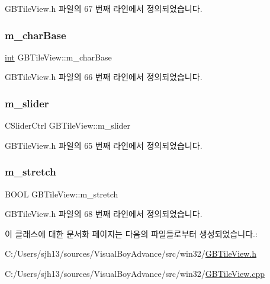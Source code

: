 G\+B\+Tile\+View.\+h 파일의 67 번째 라인에서 정의되었습니다.

\mbox{\label{class_g_b_tile_view_a0ad19c822952ef98ced0a46d051cb87e}} 
\subsubsection{\texorpdfstring{m\+\_\+char\+Base}{m\_charBase}}
{\footnotesize\ttfamily \mbox{\hyperlink{_util_8cpp_a0ef32aa8672df19503a49fab2d0c8071}{int}} G\+B\+Tile\+View\+::m\+\_\+char\+Base}



G\+B\+Tile\+View.\+h 파일의 66 번째 라인에서 정의되었습니다.

\mbox{\label{class_g_b_tile_view_ace72ce81e68876fe62cb85b09405e296}} 
\subsubsection{\texorpdfstring{m\+\_\+slider}{m\_slider}}
{\footnotesize\ttfamily C\+Slider\+Ctrl G\+B\+Tile\+View\+::m\+\_\+slider}



G\+B\+Tile\+View.\+h 파일의 65 번째 라인에서 정의되었습니다.

\mbox{\label{class_g_b_tile_view_afaaee0263ecf447f8c628d0bbf1ff76f}} 
\subsubsection{\texorpdfstring{m\+\_\+stretch}{m\_stretch}}
{\footnotesize\ttfamily B\+O\+OL G\+B\+Tile\+View\+::m\+\_\+stretch}



G\+B\+Tile\+View.\+h 파일의 68 번째 라인에서 정의되었습니다.



이 클래스에 대한 문서화 페이지는 다음의 파일들로부터 생성되었습니다.\+:\begin{DoxyCompactItemize}
\item 
C\+:/\+Users/sjh13/sources/\+Visual\+Boy\+Advance/src/win32/\mbox{\hyperlink{_g_b_tile_view_8h}{G\+B\+Tile\+View.\+h}}\item 
C\+:/\+Users/sjh13/sources/\+Visual\+Boy\+Advance/src/win32/\mbox{\hyperlink{_g_b_tile_view_8cpp}{G\+B\+Tile\+View.\+cpp}}\end{DoxyCompactItemize}
